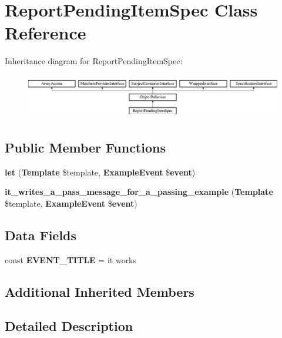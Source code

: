 \section{Report\+Pending\+Item\+Spec Class Reference}
\label{classspec_1_1_php_spec_1_1_formatter_1_1_html_1_1_report_pending_item_spec}
Inheritance diagram for Report\+Pending\+Item\+Spec\+:\begin{figure}[H]
\begin{center}
\leavevmode
\includegraphics[height=1.953488cm]{classspec_1_1_php_spec_1_1_formatter_1_1_html_1_1_report_pending_item_spec}
\end{center}
\end{figure}
\subsection*{Public Member Functions}
\begin{DoxyCompactItemize}
\item 
{\bf let} ({\bf Template} \$template, {\bf Example\+Event} \${\bf event})
\item 
{\bf it\+\_\+writes\+\_\+a\+\_\+pass\+\_\+message\+\_\+for\+\_\+a\+\_\+passing\+\_\+example} ({\bf Template} \$template, {\bf Example\+Event} \${\bf event})
\end{DoxyCompactItemize}
\subsection*{Data Fields}
\begin{DoxyCompactItemize}
\item 
const {\bf E\+V\+E\+N\+T\+\_\+\+T\+I\+T\+L\+E} = \textquotesingle{}it works\textquotesingle{}
\end{DoxyCompactItemize}
\subsection*{Additional Inherited Members}


\subsection{Detailed Description}


